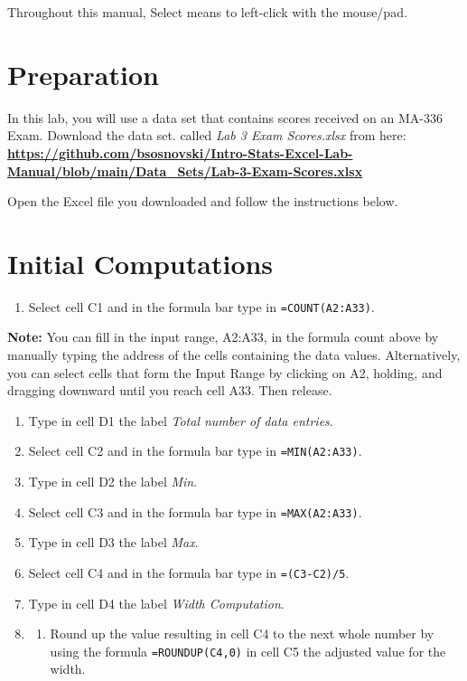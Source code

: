 \documentclass[
]{book}
\providecommand{\tightlist}{%
  \setlength{\itemsep}{0pt}\setlength{\parskip}{0pt}}
\begin{document}
Throughout this manual, Select means to left-click with the mouse/pad.

\hypertarget{preparation}{%
\section{Preparation}\label{preparation}}

In this lab, you will use a data set that contains scores received on an MA-336 Exam. Download the data set. called \emph{Lab 3 Exam Scores.xlsx} from here: \href{https://github.com/bsosnovski/Intro-Stats-Excel-Lab-Manual/blob/main/Data_Sets/Lab-3-Exam-Scores.xlsx}{\textbf{https://github.com/bsosnovski/Intro-Stats-Excel-Lab-Manual/blob/main/Data\_Sets/Lab-3-Exam-Scores.xlsx}}

Open the Excel file you downloaded and follow the instructions below.

\hypertarget{initial-computations}{%
\section{Initial Computations}\label{initial-computations}}

\begin{enumerate}
\def\labelenumi{\arabic{enumi}.}
\tightlist
\item
  Select cell C1 and in the formula bar type in \texttt{=COUNT(A2:A33)}.
\end{enumerate}

\textbf{Note:} You can fill in the input range, A2:A33, in the formula count above by manually typing the address of the cells containing the data values. Alternatively, you can select cells that form the Input Range by clicking on A2, holding, and dragging downward until you reach cell A33. Then release.

\begin{enumerate}
\def\labelenumi{\arabic{enumi}.}
\setcounter{enumi}{1}
\item
  Type in cell D1 the label \emph{Total number of data entries}.
\item
  Select cell C2 and in the formula bar type in \texttt{=MIN(A2:A33)}.
\item
  Type in cell D2 the label \emph{Min}.
\item
  Select cell C3 and in the formula bar type in \texttt{=MAX(A2:A33)}.
\item
  Type in cell D3 the label \emph{Max}.
\item
  Select cell C4 and in the formula bar type in \texttt{=(C3-C2)/5}.
\item
  Type in cell D4 the label \emph{Width Computation}.
\item
  \begin{enumerate}
  \def\labelenumii{\arabic{enumii})}
  \setcounter{enumii}{8}
  \tightlist
  \item
    Round up the value resulting in cell C4 to the next whole number by using the formula \texttt{=ROUNDUP(C4,0)} in cell C5 the adjusted value for the width.
  \end{enumerate}
\end{enumerate}
\end{document}
